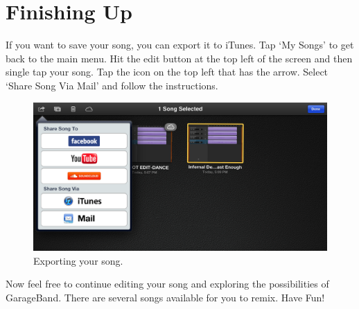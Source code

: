 \documentclass[12pt]{article}
\begin{document}
\pagebreak

\section{Finishing Up}
If you want to save your song, you can export it to iTunes. Tap `My Songs' to get back to the main menu. Hit the edit button at the top left of the screen and then single tap your song. Tap the icon on the top left that has the arrow. Select `Share Song Via Mail' and follow the instructions.
\begin{figure}[h]
   \centering
   \includegraphics[width=5in]{fig/share.png}
   \caption*{Exporting your song.}
\end{figure}

\noindent Now feel free to continue editing your song and exploring the possibilities of GarageBand. There are several songs available for you to remix. Have Fun!
\end{document}
